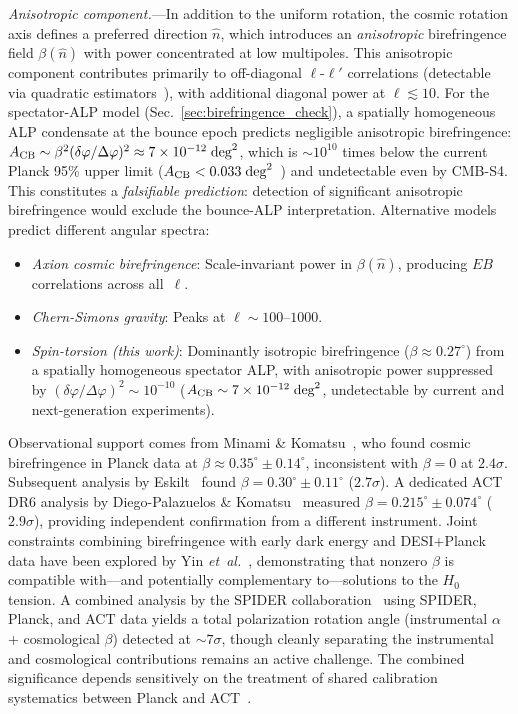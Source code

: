 \documentclass[aps,prd,twocolumn,superscriptaddress,showpacs,preprintnumbers,nofootinbib,longbibliography,floatfix]{revtex4-2}
\newcommand{\etal}{\textit{et~al.}}
\begin{document}
\textit{Anisotropic component.}---In addition to the uniform rotation, the cosmic rotation axis defines a preferred direction $\hat{n}$, which introduces an \textit{anisotropic} birefringence field $\beta(\hat{n})$ with power concentrated at low multipoles. This anisotropic component contributes primarily to off-diagonal $\ell$-$\ell'$ correlations (detectable via quadratic estimators~\cite{Eskilt2022}), with additional diagonal power at $\ell\lesssim 10$. For the spectator-ALP model (Sec.~\ref{sec:birefringence_check}), a spatially homogeneous ALP condensate at the bounce epoch predicts negligible anisotropic birefringence: $A_{\rm CB} \sim \beta^2 (\delta\varphi/\Delta\varphi)^2 \approx 7 \times 10^{-12}\;\text{deg}^2$, which is ${\sim}10^{10}$ times below the current Planck 95\% upper limit ($A_{\rm CB} < 0.033\;\text{deg}^2$~\cite{Namikawa2020}) and undetectable even by CMB-S4. This constitutes a \emph{falsifiable prediction}: detection of significant anisotropic birefringence would exclude the bounce-ALP interpretation. Alternative models predict different angular spectra:
\begin{itemize}[leftmargin=*]
\item \textit{Axion cosmic birefringence}: Scale-invariant power in $\beta(\hat{n})$, producing $EB$ correlations across all~$\ell$.
\item \textit{Chern-Simons gravity}: Peaks at $\ell\sim 100$--$1000$.
\item \textit{Spin-torsion (this work)}: Dominantly isotropic birefringence ($\beta \approx 0.27^\circ$) from a spatially homogeneous spectator ALP, with anisotropic power suppressed by $({\delta\varphi}/{\Delta\varphi})^2 \sim 10^{-10}$ ($A_{\rm CB} \sim 7 \times 10^{-12}\;\text{deg}^2$, undetectable by current and next-generation experiments).
\end{itemize}

Observational support comes from Minami \& Komatsu~\cite{Minami2020}, who found cosmic birefringence in Planck data at $\beta\approx 0.35^\circ\pm 0.14^\circ$, inconsistent with $\beta=0$ at $2.4\sigma$. Subsequent analysis by Eskilt~\cite{Eskilt2022} found $\beta = 0.30^\circ \pm 0.11^\circ$ ($2.7\sigma$). A dedicated ACT DR6 analysis by Diego-Palazuelos \& Komatsu~\cite{DiegoPalazuelos2025} measured $\beta = 0.215^\circ \pm 0.074^\circ$ ($2.9\sigma$), providing independent confirmation from a different instrument. Joint constraints combining birefringence with early dark energy and DESI+Planck data have been explored by Yin \etal~\cite{Yin2026}, demonstrating that nonzero $\beta$ is compatible with---and potentially complementary to---solutions to the $H_0$ tension. A combined analysis by the SPIDER collaboration~\cite{SPIDER2025} using SPIDER, Planck, and ACT data yields a total polarization rotation angle (instrumental $\alpha$ + cosmological $\beta$) detected at ${\sim}7\sigma$, though cleanly separating the instrumental and cosmological contributions remains an active challenge. The combined significance depends sensitively on the treatment of shared calibration systematics between Planck and ACT~\cite{ACT2024}.
\end{document}
